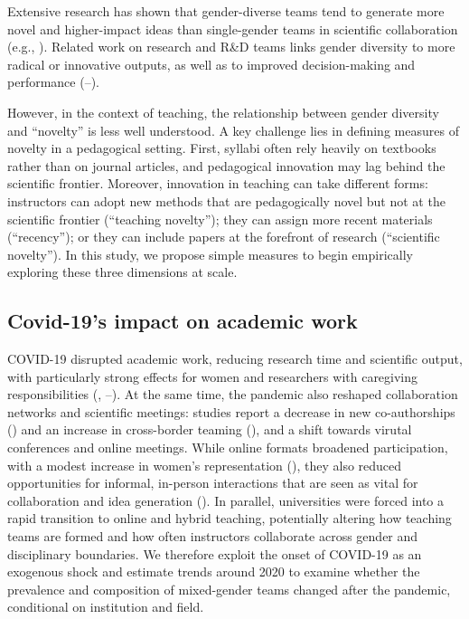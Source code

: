 \documentclass[
  british,
  12pt, %
]{article}
\begin{document}
Extensive research has shown that gender-diverse teams tend to generate more novel and higher-impact ideas than single-gender teams in scientific collaboration (e.g., ). Related work on research and R\&D teams links gender diversity to more radical or innovative outputs, as well as to improved decision-making and performance (--).

However, in the context of teaching, the relationship between gender diversity and ``novelty'' is less well understood. A key challenge lies in defining measures of novelty in a pedagogical setting. First, syllabi often rely heavily on textbooks rather than on journal articles, and pedagogical innovation may lag behind the scientific frontier. Moreover, innovation in teaching can take different forms: instructors can adopt new methods that are pedagogically novel but not at the scientific frontier (``teaching novelty''); they can assign more recent materials (``recency''); or they can include papers at the forefront of research (``scientific novelty''). In this study, we propose simple measures to begin empirically exploring these three dimensions at scale.

\subsection{Covid-19's impact on academic work}\label{covid-19s-impact-on-academic-work}

COVID-19 disrupted academic work, reducing research time and scientific output, with particularly strong effects for women and researchers with caregiving responsibilities (, --). At the same time, the pandemic also reshaped collaboration networks and scientific meetings: studies report a decrease in new co-authorships () and an increase in cross-border teaming (), and a shift towards virutal conferences and online meetings. While online formats broadened participation, with a modest increase in women's representation (), they also reduced opportunities for informal, in-person interactions that are seen as vital for collaboration and idea generation (). In parallel, universities were forced into a rapid transition to online and hybrid teaching, potentially altering how teaching teams are formed and how often instructors collaborate across gender and disciplinary boundaries. We therefore exploit the onset of COVID-19 as an exogenous shock and estimate trends around 2020 to examine whether the prevalence and composition of mixed-gender teams changed after the pandemic, conditional on institution and field.
\end{document}
